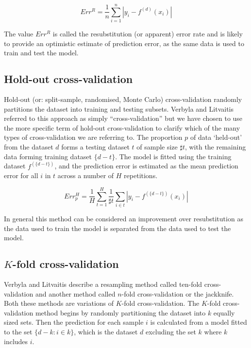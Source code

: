 \begin{equation}
Err^{R} = \frac{1}{n} \sum_{i=1}^{n} | y_i - f^{(d)}(x_i) |
\label{eq:resubstitution}
\end{equation}

The value $Err^{R}$ is called the resubstitution (or apparent) error
rate and is likely to provide an optimistic estimate of prediction
error, as the same data is used to train and test the model.

\subsection{Hold-out cross-validation}

Hold-out (or: split-sample, randomised, Monte Carlo) cross-validation
randomly partitions the dataset into training and testing subsets. 
Verbyla and Litvaitis\supercite{verbyla-1989} referred to this approach as 
simply ``cross-validation'' but we have chosen to use the more specific 
term of hold-out cross-validation to clarify which of the many types of 
cross-validation we are referring to. The proportion $p$ of data `held-out' 
from the dataset $d$ forms a testing
dataset $t$ of sample size $\sharp t$, with the remaining data forming
training dataset $\{d-t\}$. The model is fitted using the training
dataset $f^{(\{d-t\})}$, and the prediction error is estimated as the
mean prediction error for all $i$ in $t$ across a number of $H$
repetitions.

\begin{equation}
Err^{H}_{p} = \frac{1}{H } \sum_{t=1}^{H} \frac{1}{\sharp t} \sum_{i \in t} | y_i - f^{(\{d-t\})}(x_i) |
\end{equation}

In general this method can be considered an improvement over
resubstitution as the data used to train the model is separated from the
data used to test the model.

\subsection{$K$-fold cross-validation}

Verbyla and Litvaitis\supercite{verbyla-1989} describe a resampling method called ten-fold
cross-validation and another method called $n$-fold cross-validation or the jackknife.
Both these methods are variations of $K$-fold cross-validation. The $K$-fold
cross-validation method begins by randomly partitioning the
dataset into $k$ equally sized sets. Then the prediction for each sample
$i$ is calculated from a model fitted to the set $\{d-k : i \in k\}$,
which is the dataset $d$ excluding the set $k$ where $k$ includes $i$.

